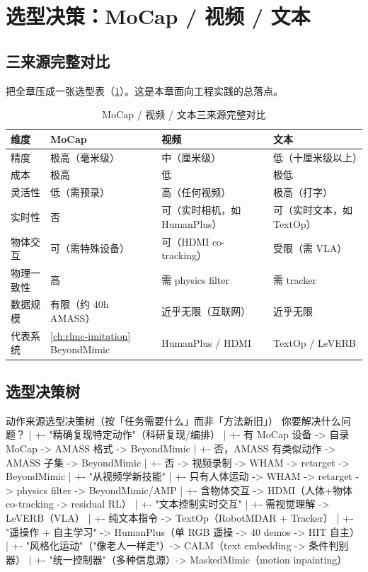 \section{选型决策：MoCap / 视频 / 文本}
\label{sec:rlmc-mm-choose}

\subsection{三来源完整对比}
\label{sec:rlmc-mm-choose-compare}

把全章压成一张选型表（\cref{tab:rlmc-mm-choose}）。这是本章面向工程实践的总落点。

\begin{table}[ht]
\centering
\small
\caption{MoCap / 视频 / 文本三来源完整对比}
\label{tab:rlmc-mm-choose}
\begin{tabular}{@{}llll@{}}
\toprule
维度 & MoCap & 视频 & 文本 \\
\midrule
精度 & 极高（毫米级） & 中（厘米级） & 低（十厘米级以上） \\
成本 & 极高 & 低 & 极低 \\
灵活性 & 低（需预录） & 高（任何视频） & 极高（打字） \\
实时性 & 否 & 可（实时相机，如 HumanPlus） & 可（实时文本，如 TextOp） \\
物体交互 & 可（需特殊设备） & 可（HDMI co-tracking） & 受限（需 VLA） \\
物理一致性 & 高 & 需 physics filter & 需 tracker \\
数据规模 & 有限（约 40h AMASS） & 近乎无限（互联网） & 近乎无限 \\
代表系统 & \cref{ch:rlmc-imitation} BeyondMimic & HumanPlus / HDMI & TextOp / LeVERB \\
\bottomrule
\end{tabular}
\end{table}

\subsection{选型决策树}
\label{sec:rlmc-mm-choose-tree}

\begin{codebox}{动作来源选型决策树（按「任务需要什么」而非「方法新旧」）}
你要解决什么问题？
|
+- "精确复现特定动作"（科研复现/编排）
|    +- 有 MoCap 设备 -> 自录 MoCap -> AMASS 格式 -> BeyondMimic
|    +- 否，AMASS 有类似动作 -> AMASS 子集 -> BeyondMimic
|    +- 否 -> 视频录制 -> WHAM -> retarget -> BeyondMimic
|
+- "从视频学新技能"
|    +- 只有人体运动 -> WHAM -> retarget -> physics filter -> BeyondMimic/AMP
|    +- 含物体交互 -> HDMI（人体+物体 co-tracking -> residual RL）
|
+- "文本控制实时交互"
|    +- 需视觉理解 -> LeVERB（VLA）
|    +- 纯文本指令 -> TextOp（RobotMDAR + Tracker）
|
+- "遥操作 + 自主学习" -> HumanPlus（单 RGB 遥操 -> 40 demos -> HIT 自主）
|
+- "风格化运动"（"像老人一样走"）-> CALM（text embedding -> 条件判别器）
|
+- "统一控制器"（多种信息源）-> MaskedMimic（motion inpainting）
\end{codebox}

